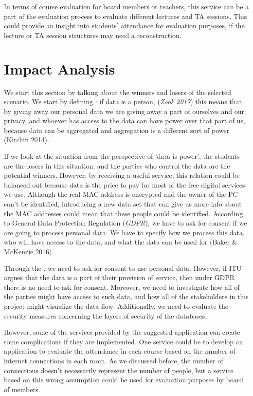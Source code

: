 \documentclass[format=acmsmall, review=false, screen=true]{acmart}
\begin{document}
In terms of course evaluation for board members or teachers, this service can be a part of the evaluation process to evaluate different lectures and TA sessions. This could provide an insight into students’ attendance for evaluation purposes, if the lecture or TA session structures may need a reconstruction. 

\section{Impact Analysis}

We start this section by talking about the winners and losers of the selected scenario. We start by defining : if data is a person, (\textit{Zook 2017}) this means that by giving away our personal data we are giving away a part of ourselves and our privacy, and whoever has access to the data can have power over that part of us, because data can be aggregated and aggregation is a different sort of power (Kitchin 2014).

If we look at the situation from the perspective of ‘data is power’, the students are the losers in this situation, and the parties who control the data are the potential winners. However, by receiving a useful service, this relation could be balanced out because data is the price to pay for most of the free digital services we use. Although the real MAC address is encrypted and the owner of the PC can’t be identified, introducing a new data set that can give us more info about the MAC addresses could mean that these people could be identified.
According to General Data Protection Regulation (\textit{GDPR}), we have to ask for consent if we are going to process personal data. We have to specify how we process this data, who will have access to the data, and what the data can be used for (Baker \& McKenzie 2016).

Through the , we need to ask for consent to use personal data. However, if ITU argues that the data is a part of their provision of service, then under GDPR there is no need to ask for consent.
Moreover, we need to investigate how all of the parties might have access to such data, and how all of the stakeholders in this project might visualize the data flow. Additionally, we need to evaluate the security measures concerning the layers of security of the databases.

However, some of the services provided by the suggested application can create some complications if they are implemented. One service could be to develop an application to evaluate the attendance in each course based on the number of internet connections in each room. As we discussed before, the number of connections doesn’t necessarily represent the number of people, but a service based on this wrong assumption could be used for evaluation purposes by board of members.
\end{document}
